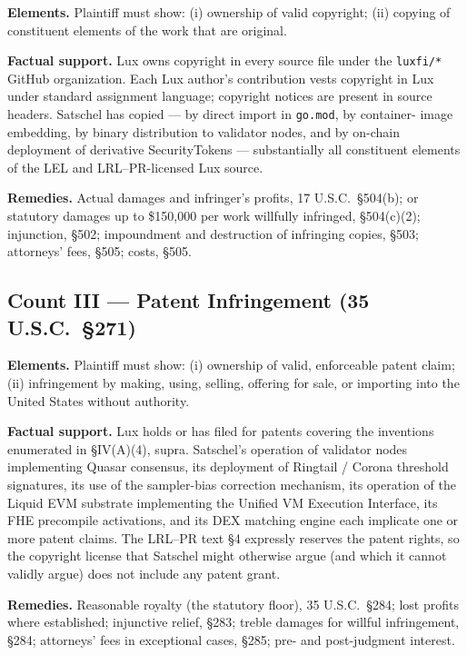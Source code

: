 \documentclass[11pt,letterpaper]{article}
\begin{document}
\textbf{Elements.} Plaintiff must show: (i) ownership of valid
copyright; (ii) copying of constituent elements of the work that are
original.

\textbf{Factual support.} Lux owns copyright in every source file
under the \texttt{luxfi/*} GitHub organization. Each Lux author's
contribution vests copyright in Lux under standard assignment
language; copyright notices are present in source headers. Satschel
has copied --- by direct import in \texttt{go.mod}, by container-
image embedding, by binary distribution to validator nodes, and by
on-chain deployment of derivative SecurityTokens --- substantially all
constituent elements of the LEL and LRL--PR-licensed Lux source.

\textbf{Remedies.} Actual damages and infringer's profits, 17 U.S.C.\
\S 504(b); or statutory damages up to \$150,000 per work willfully
infringed, \S 504(c)(2); injunction, \S 502; impoundment and
destruction of infringing copies, \S 503; attorneys' fees, \S 505;
costs, \S 505.

\subsection*{Count III --- Patent Infringement (35 U.S.C.\ \S 271)}

\textbf{Elements.} Plaintiff must show: (i) ownership of valid,
enforceable patent claim; (ii) infringement by making, using,
selling, offering for sale, or importing into the United States
without authority.

\textbf{Factual support.} Lux holds or has filed for patents covering
the inventions enumerated in \S IV(A)(4), supra. Satschel's
operation of validator nodes implementing Quasar consensus, its
deployment of Ringtail / Corona threshold signatures, its use of the
sampler-bias correction mechanism, its operation of the Liquid EVM
substrate implementing the Unified VM Execution Interface, its FHE
precompile activations, and its DEX matching engine each implicate
one or more patent claims. The LRL--PR text \S 4 expressly reserves
the patent rights, so the copyright license that Satschel might
otherwise argue (and which it cannot validly argue) does not include
any patent grant.

\textbf{Remedies.} Reasonable royalty (the statutory floor), 35
U.S.C.\ \S 284; lost profits where established; injunctive relief,
\S 283; treble damages for willful infringement, \S 284; attorneys'
fees in exceptional cases, \S 285; pre- and post-judgment interest.
\end{document}
